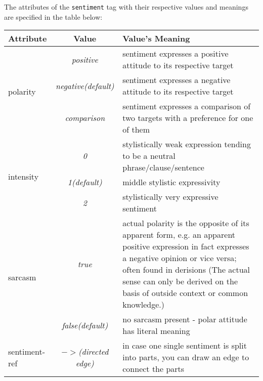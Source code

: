 \documentclass[11pt,a4paper]{article}
\begin{document}
The attributes of the \texttt{sentiment} tag with their respective
values and meanings are specified in the table below: \\
\begin{tabular}[t]{|l|c|p{}|}\hline
  Attribute & Value & Value's Meaning\\\hline
  \multirow{3}{*}{polarity} & \textit{positive} & sentiment
  expresses a positive attitude to its respective target\\\cline{2-3}

  & \textit{negative\newline(default)} & sentiment
  expresses a negative attitude to its respective target\\\cline{2-3}

  & \textit{comparison} & sentiment expresses a comparison of two
  targets with a preference for one of them\\\hline
  \multirow{3}{*}{intensity} & \textit{0} & stylistically weak
  expression tending to be a neutral phrase/clause/sentence\\\cline{2-3}

  & \textit{1\newline(default)} & middle stylistic
  expressivity\\\cline{2-3}

  & \textit{2} & stylistically very expressive sentiment\\\hline
  \multirow{2}{*}{sarcasm} & \textit{true} & actual polarity is the 
  opposite of its apparent form, e.g. an apparent positive expression
  in fact expresses a negative opinion or vice versa; often found in derisions (The actual sense can only be derived
  on the basis of outside context or common knowledge.)\\\cline{2-3}

  & \textit{false\newline(default)} & no sarcasm present - polar
  attitude has literal meaning\\\hline
  sentiment-ref & \textit{$->$\newline(directed edge)} & in case one
  single sentiment is split into parts, you can draw an edge to connect the parts\\\hline 
\end{tabular}
\vspace{1.5cm}
\end{document}
